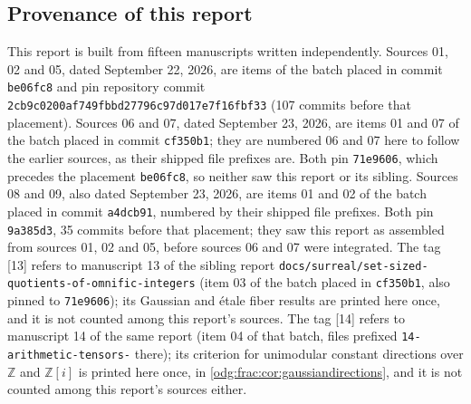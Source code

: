 \documentclass[11pt,oneside]{article}
\numberwithin{equation}{section}
\theoremstyle{definition}
\theoremstyle{remark}
\newcommand{\Z}{\mathbb Z}
\newcommand{\pin}{\texttt{2cb9c0200af749fbbd27796c97d017e7f16fbf33}}
\newcommand{\src}[1]{\textup{\textsf{\small[#1]}}}
\newcommand{\fn}[1]{\nolinkurl{#1}}
\begin{document}
\subsection{Provenance of this report}\label{odg:sub:provenance}

This report is built from fifteen manuscripts written independently. Sources
01, 02 and 05, dated September 22, 2026, are items of the batch placed in
commit \texttt{be06fc8} and pin repository commit \pin{} (107 commits before
that placement). Sources 06 and 07, dated September 23, 2026, are items 01
and 07 of the batch placed in commit \texttt{cf350b1}; they are numbered 06
and 07 here to follow the earlier sources, as their shipped file prefixes
are. Both pin \texttt{71e9606}, which precedes the placement \texttt{be06fc8},
so neither saw this report or its sibling. Sources 08 and 09, also dated
September 23, 2026, are items 01 and 02 of the batch placed in commit
\texttt{a4dcb91}, numbered by their shipped file prefixes. Both pin
\texttt{9a385d3}, 35 commits before that placement; they saw this report as
assembled from sources 01, 02 and 05, before sources 06 and 07 were
integrated. The tag \src{13} refers to
manuscript 13 of the sibling report
\fn{docs/surreal/set-sized-quotients-of-omnific-integers} (item 03 of the
batch placed in \texttt{cf350b1}, also pinned to \texttt{71e9606}); its
Gaussian and \'etale fiber results are printed here once, and it is not
counted among this report's sources. The tag \src{14} refers to manuscript 14
of the same report (item 04 of that batch, files prefixed
\fn{14-arithmetic-tensors-} there); its criterion for unimodular constant
directions over $\Z$ and $\Z[i]$ is printed here once, in
\cref{odg:frac:cor:gaussiandirections}, and it is not counted among this
report's sources either.
\end{document}
